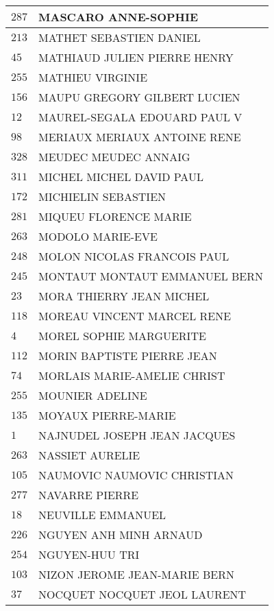 \begin{xltabular}{\linewidth}{|l|X|}
    \hline
    $287$ & MASCARO ANNE-SOPHIE \\
    \hline
    $213$ & MATHET SEBASTIEN DANIEL \\
    \hline
    $45$ & MATHIAUD JULIEN PIERRE HENRY \\
    \hline
    $255$ & MATHIEU VIRGINIE \\
    \hline
    $156$ & MAUPU GREGORY GILBERT LUCIEN \\
    \hline
    $12$ & MAUREL-SEGALA EDOUARD PAUL V \\
    \hline
    $98$ & MERIAUX MERIAUX ANTOINE RENE \\
    \hline
    $328$ & MEUDEC MEUDEC ANNAIG \\
    \hline
    $311$ & MICHEL MICHEL DAVID PAUL \\
    \hline
    $172$ & MICHIELIN SEBASTIEN \\
    \hline
    $281$ & MIQUEU FLORENCE MARIE \\
    \hline
    $263$ & MODOLO MARIE-EVE \\
    \hline
    $248$ & MOLON NICOLAS FRANCOIS PAUL \\
    \hline
    $245$ & MONTAUT MONTAUT EMMANUEL BERN \\
    \hline
    $23$ & MORA THIERRY JEAN MICHEL \\
    \hline
    $118$ & MOREAU VINCENT MARCEL RENE \\
    \hline
    $4$ & MOREL SOPHIE MARGUERITE \\
    \hline
    $112$ & MORIN BAPTISTE PIERRE JEAN \\
    \hline
    $74$ & MORLAIS MARIE-AMELIE CHRIST \\
    \hline
    $255$ & MOUNIER ADELINE \\
    \hline
    $135$ & MOYAUX PIERRE-MARIE \\
    \hline
    $1$ & NAJNUDEL JOSEPH JEAN JACQUES \\
    \hline
    $263$ & NASSIET AURELIE \\
    \hline
    $105$ & NAUMOVIC NAUMOVIC CHRISTIAN \\
    \hline
    $277$ & NAVARRE PIERRE \\
    \hline
    $18$ & NEUVILLE EMMANUEL \\
    \hline
    $226$ & NGUYEN ANH MINH ARNAUD \\
    \hline
    $254$ & NGUYEN-HUU TRI \\
    \hline
    $103$ & NIZON JEROME JEAN-MARIE BERN \\
    \hline
    $37$ & NOCQUET NOCQUET JEOL LAURENT \\

\end{xltabular}
